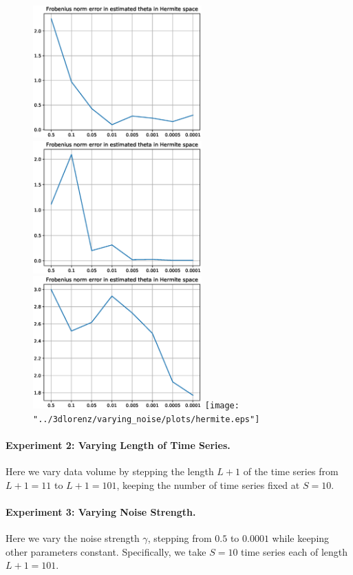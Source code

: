 \documentclass{article}
\begin{document}
\begin{figure}[th]
\includegraphics[height=2in]{"../1dcode/varying_noise/plots/hermite.eps"}
\includegraphics[height=2in]{"../2dcode/varying_noise/plots/hermite.eps"}
\includegraphics[height=2in]{"../3ddampedduffing/varying_noise/plots/hermite.eps"}
\texttt{[image: "../3dlorenz/varying\_noise/plots/hermite.eps"]}
\end{figure}

\paragraph{Experiment 2: Varying Length of Time Series.} Here we vary data volume by stepping the length $L+1$ of the time series from $L+1 = 11$ to $L+1 = 101$, keeping the number of time series fixed at $S=10$.

\paragraph{Experiment 3: Varying Noise Strength.} Here we vary the noise strength $\gamma$, stepping from $0.5$ to $0.0001$ while keeping other parameters constant.  Specifically, we take $S=10$ time series each of length $L+1 = 101$.
\end{document}

